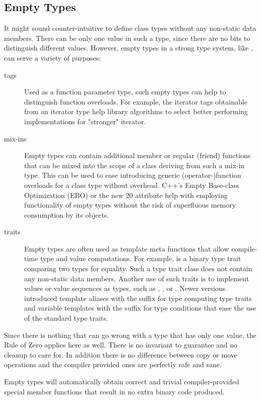 \documentclass[ebook,11pt,article]{memoir}
\begin{document}
\subsection{Empty Types}
It might sound counter-intuitive to define class types without any non-static data members. There can be only one value in such a type, since there are no bits to distinguish different values. However, empty types in a strong type system, like \Cpp{}, can serve a variety of purposes:
\begin{description}
\item[tags] Used as a function parameter type, such empty types can help to distinguish function overloads. For example, the iterator tags obtainable from an iterator type help library algorithms to select better performing implementations for "stronger" iterator.
\item[mix-ins] Empty types can contain additional member or regular (friend) functions that can be mixed into the scope of a class deriving from such a mix-in type. This can be used to ease introducing generic (operator-)function overloads for a class type without overhead. C++'s Empty Base-class Optimization (EBO) or the new \Cpp{}20 attribute  help with employing functionality of empty types without the risk of superfluous memory consumption by its objects.
\item[traits] Empty types are often used as template meta functions that allow compile-time type and value computations. For example,  is a binary type trait comparing two types for equality. Such a type trait class does not contain any non-static data members. Another use of such traits is to implement values or value sequences as types, such as , , or . Newer \Cpp{} versions introduced template aliases with the suffix  for type computing type traits and  variable templates with the suffix  for type conditions that ease the use of the standard type traits.
\end{description}
Since there is nothing that can go wrong with a type that has only one value, the Rule of Zero applies here as well. There is no invariant to guarantee and no cleanup to care for. In addition there is no difference between copy or move operations and the compiler provided ones are perfectly safe and sane.

Empty types will automatically obtain correct and trivial compiler-provided special member functions that result in no extra binary code produced.
\end{document}
